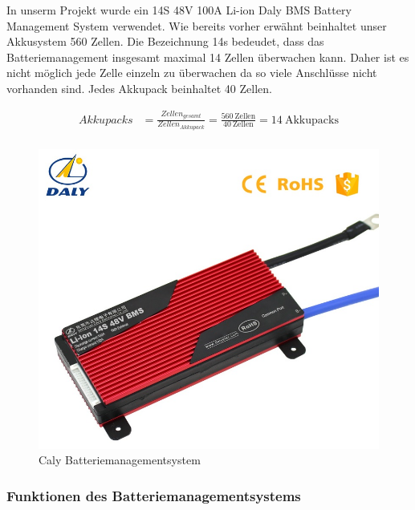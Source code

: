 In unserm Projekt wurde ein 14S 48V 100A Li-ion Daly BMS Battery Management System verwendet. Wie bereits vorher erwähnt beinhaltet unser Akkusystem 560 Zellen. Die Bezeichnung 14s bedeudet, dass das Batteriemanagement insgesamt maximal 14 Zellen überwachen kann. Daher ist es nicht möglich jede Zelle einzeln zu überwachen da so viele Anschlüsse nicht vorhanden sind. Jedes Akkupack beinhaltet 40 Zellen.

\begin{align*}
Akkupacks &= \frac{Zellen_{gesamt}}{Zellen_{Akkupack}} = \frac{560~\mathrm{Zellen}}{40~\mathrm{Zellen}} = 14~\mathrm{Akkupacks}\\
\end{align*}

\begin{figure}[H]
	\begin{center}
		\includegraphics[scale=0.9]{figures/Akku/Daly Batteriemanagementsystem.jpg}
		\caption{Caly Batteriemanagementsystem}
	\end{center}
\end{figure}

\subsubsection{Funktionen des Batteriemanagementsystems}


